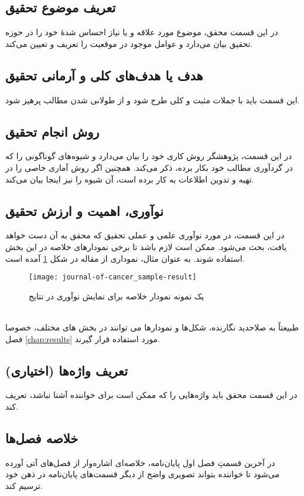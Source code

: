 \subsection{تعریف موضوع تحقیق}
در این قسمت محقق، موضوع مورد علاقه و یا نیاز احساس شدهٔ خود را در حوزه تحقیق بیان می‌دارد و عوامل موجود در موقعیت را تعریف و تعیین می‌کند.

\subsection{هدف یا هدف‌های کلی و آرمانی تحقیق}
این قسمت باید با جملات مثبت و کلی طرح شود و از طولانی شدن مطالب پرهیز شود.

\subsection{روش انجام تحقیق}
در این قسمت، پژوهشگر روش کاری خود را بیان می‌دارد و شیوه‌های گوناگونی را که در گردآوری مطالب خود بکار برده، ذکر می‌کند. همچنین اگر روش آماری خاصی را در تهیه و تدوین اطلاعات به کار برده است، آن شیوه را نیز اینجا بیان می‌کند.

\subsection{نوآوری، اهمیت و ارزش تحقیق}
در این قسمت، در مورد نوآوری علمی و عملی تحقیق که محقق به آن دست خواهد یافت، بحث می‌شود. ممکن است لازم باشد تا برخی نمودارهای خلاصه در این بخش استفاده شوند. به عنوان مثال، نموداری از مقاله
\cite{kim2016integrated}
در شکل
\ref{fig:sampleDiagram}
آمده است.
\begin{figure}[ht]
	\centerline{\texttt{[image: journal-of-cancer\_sample-result]}}
	\caption{یک نمونه نمودار خلاصه برای نمایش نوآوری در نتایج
	}
	\label{fig:sampleDiagram}
\end{figure}\\
طبیعتاً به صلاحدید نگارنده، شکل‌ها و نمودار‌ها می توانند در بخش های مختلف، خصوصا فصل
\ref{chap:results}
مورد استفاده قرار گیرند.

\subsection{تعریف واژه‌ها (اختیاری)}
در این قسمت محقق باید واژه‌هایی را که ممکن است برای خواننده آشنا نباشد، تعریف کند.

\subsection{خلاصه فصل‌ها}
در آخرین قسمتِ فصل اول پایان‌نامه، خلاصه‌ای اشاره‌وار از فصل‌های آتی آورده می‌شود تا خواننده بتواند تصویری واضح از دیگر قسمت‌های پایان‌نامه در ذهن خود ترسیم کند.

